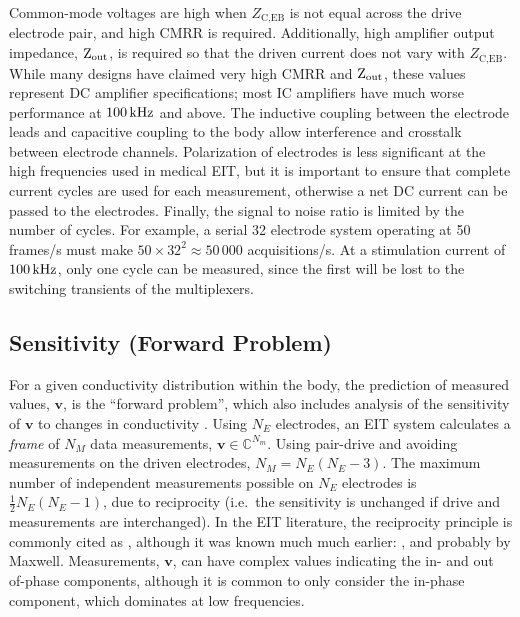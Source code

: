 \documentclass[12pt]{article} \usepackage[margin=3cm]{geometry} \usepackage[margin=20pt,font=small,labelfont=bf]{caption}\def\TBLWIDA{35mm}\def\TBLWIDB{95mm}
\newcommand{\vB}{\mathbf{v}}
\begin{document}
Common-mode voltages are high when $Z_\textrm{C,EB}$ is not 
equal across the drive electrode pair, and high CMRR
is required. Additionally, high amplifier output impedance, $\rm Z_{out}$,
is required so that the driven current does not vary with
$Z_\textrm{C,EB}$. While many designs have claimed very high
CMRR and $\rm Z_{out}$, these values represent DC amplifier
specifications; most IC amplifiers have
much worse performance at $\rm 100\,kHz$ and above.
The inductive coupling between the electrode leads and capacitive
coupling to the body allow interference and crosstalk between
electrode channels.
Polarization of electrodes is less significant at the high
frequencies used in medical EIT, but it is important to ensure
that complete current cycles are used for
each measurement, otherwise a net DC current can be passed
to the electrodes.
Finally, the signal to noise ratio is limited by the number 
of cycles. For example, a serial 32 electrode system
 operating at 50 frames/s
must make $50\times32^2 \approx 50\,000$ acquisitions/s.
At a stimulation
current of $\rm 100\,kHz$, only one cycle can be measured, since
the first will be lost to the switching transients of the multiplexers.




\subsection{Sensitivity (Forward Problem)}

For a given conductivity distribution
within the body, the prediction of measured values, $\vB$,
is the ``forward problem'', which also includes analysis
of the sensitivity of $\vB$ to
changes in conductivity \cite{Cheney1999EIT}.
Using $N_E$ electrodes, an EIT system calculates a {\em frame}
of $N_M$ data measurements, $\vB \in \mathbb{C}^{N_m}$.
 Using pair-drive and avoiding measurements
on the driven electrodes, $N_M  = N_E(N_E-3)$.
The maximum number of independent measurements
possible on $N_E$ electrodes is
 $\frac{1}{2}N_E(N_E-1)$, due to reciprocity (i.e.\ the sensitivity
is unchanged if drive and measurements are interchanged).
In the EIT literature, the reciprocity principle is commonly cited as
\cite{Geselowitz1971Reciprocity}, although it was known much much earlier:
\cite{Lorentz1896Reciprocity}, and probably by Maxwell.
Measurements, $\vB$, can have complex values
indicating the in- and out of-phase components, although it is
common to only consider the in-phase component, which dominates
at low frequencies.
\end{document}

